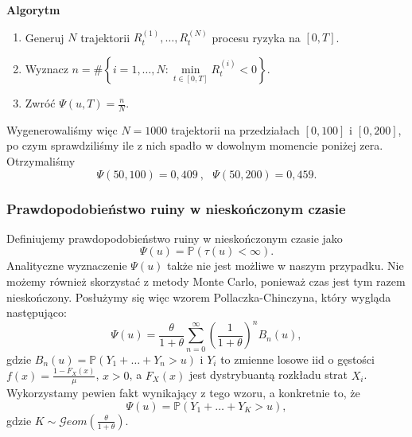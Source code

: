 \documentclass[12pt]{mwart}
\begin{document}
	\noindent \textbf{Algorytm}
	\begin{enumerate}[leftmargin=10mm]
		\item Generuj $N$ trajektorii $R_t^{(1)}, \dots, R_t^{(N)}$ procesu ryzyka na $[0, T]$.
		\item Wyznacz $ n = \#\left\{ i = 1,\dots,N: \min\limits_{t \in [0, T]} R_t^{(i)} < 0 \right\} $.
		\item Zwróć $\Psi(u, T) = \frac{n}{N}$.
	\end{enumerate}
	Wygenerowaliśmy więc $N = 1000$ trajektorii na przedziałach $[0, 100]$ i $[0, 200]$, po czym sprawdziliśmy ile z nich spadło w dowolnym momencie poniżej zera. Otrzymaliśmy
	$$ \Psi(50, 100) = 0,409 \ , \ \ \ \Psi(50, 200) = 0,459 .$$
	
	\subsubsection{Prawdopodobieństwo ruiny w nieskończonym czasie}
	\noindent Definiujemy prawdopodobieństwo ruiny w nieskończonym czasie jako
	$$ \Psi(u) = \mathbb{P}(\tau(u) < \infty). $$
	Analityczne wyznaczenie $\Psi(u)$ także nie jest możliwe w naszym przypadku. Nie możemy również skorzystać z metody Monte Carlo, ponieważ czas jest tym razem nieskończony. Posłużymy się więc wzorem Pollaczka-Chinczyna, który wygląda następująco:
	$$ \Psi(u) = \frac{\theta}{1 + \theta} \sum_{n=0}^{\infty} \left( \frac{1}{1 + \theta} \right)^n B_n(u), $$
	gdzie $B_n(u) = \mathbb{P}(Y_1 + \dots + Y_n > u)$ i $Y_i$ to zmienne losowe iid o gęstości \mbox{$f(x) = \frac{1 - F_X(x)}{\mu}$}, $x > 0$, a $F_X(x)$ jest dystrybuantą rozkładu strat $X_i$. Wykorzystamy pewien fakt wynikający z tego wzoru, a konkretnie to, że
	$$ \Psi(u) = \mathbb{P}(Y_1 + \dots + Y_K > u), $$
	gdzie $K \sim \mathcal{G}eom \left( \frac{\theta}{1+\theta} \right)$.\\
	
\end{document}
